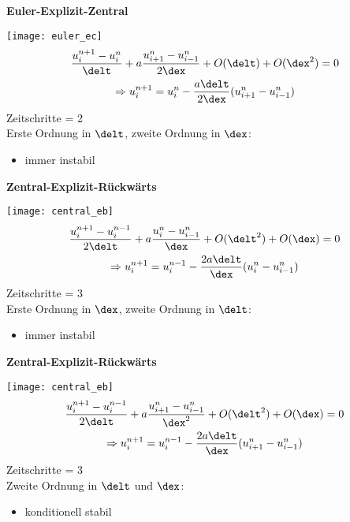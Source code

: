 \textbf{Euler-Explizit-Zentral}
\begin{multicols}{2}
	\texttt{[image: euler\_ec]}
\columnbreak
	\begin{multline*}
		\frac{u^{n+1}_i - u^n_i}{\delt} + a\frac{u^{n}_{i+1} - u^{n}_{i-1}}{2\dex} + O(\delt) + O(\dex^2) = 0 \\
		\Rightarrow u^{n+1}_i = u^n_i - \frac{a\delt}{2\dex}(u^{n}_{i+1} - u^{n}_{i-1})
	\end{multline*}
	Zeitschritte = 2\\
	Erste Ordnung in $\delt$, zweite Ordnung in $\dex$: 
	\begin{itemize}
		\item immer instabil
	\end{itemize}
\end{multicols}

\textbf{Zentral-Explizit-R\"uckw\"arts}
\begin{multicols}{2}
	\texttt{[image: central\_eb]}
\columnbreak
	\begin{multline*}
		\frac{u^{n+1}_i - u^{n-1}_i}{2\delt} + a\frac{u^{n}_{i} - u^{n}_{i-1}}{\dex} + O(\delt^2) + O(\dex) = 0 \\
		\Rightarrow u^{n+1}_i = u^{n-1}_i - \frac{2a\delt}{\dex}(u^{n}_{i} - u^{n}_{i-1})
	\end{multline*}
	Zeitschritte = 3\\
	Erste Ordnung in $\dex$, zweite Ordnung in $\delt$: 
	\begin{itemize}
		\item immer instabil
	\end{itemize}
\end{multicols}

\textbf{Zentral-Explizit-R\"uckw\"arts}
\begin{multicols}{2}
	\texttt{[image: central\_eb]}
\columnbreak
	\begin{multline*}
		\frac{u^{n+1}_i - u^{n-1}_i}{2\delt} + a\frac{u^{n}_{i+1} - u^{n}_{i-1}}{\dex^2} + O(\delt^2) + O(\dex) = 0 \\
		\Rightarrow u^{n+1}_i = u^{n-1}_i - \frac{2a\delt}{\dex}(u^{n}_{i+1} - u^{n}_{i-1})
	\end{multline*}
	Zeitschritte = 3\\
	Zweite Ordnung in $\delt$ und $\dex$: 	
	\begin{itemize}
		\item konditionell stabil
	\end{itemize}
\end{multicols}

